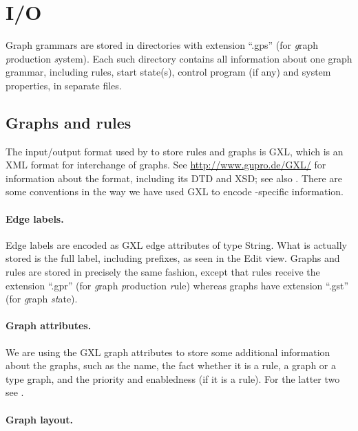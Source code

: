 \section{I/O}

Graph grammars are stored in directories with extension ``\textsf{.gps}'' (for
\emph{g}raph \emph{p}roduction \emph{s}ystem). Each such directory contains all
information about one graph grammar, including rules, start state(s), control
program (if any) and system properties, in separate files.

\subsection{Graphs and rules}

The input/output format used by \GROOVE to store rules and graphs is GXL,
which is an XML format for interchange of graphs. See
\url{http://www.gupro.de/GXL/} for information about the format, including its
DTD and XSD; see also \cite{GXL}. There are some conventions in the way we have
used GXL to encode \GROOVE-specific information.

\paragraph{Edge labels.}

Edge labels are encoded as GXL edge attributes of type \textsf{String}. What is
actually stored is the full label, including prefixes, as seen in the Edit
view. Graphs and rules are stored in precisely the same fashion, except that
rules receive the extension ``\textsf{.gpr}'' (for \emph{g}raph
\emph{p}roduction \emph{r}ule) whereas graphs have extension ``\textsf{.gst}''
(for \emph{g}raph \emph{st}ate).

\paragraph{Graph attributes.}

We are using the GXL graph attributes to store some additional information
about the graphs, such as the name, the fact whether it is a rule, a graph or a
type graph, and the priority and enabledness (if it is a rule). For the latter
two see .

\paragraph{Graph layout.}

